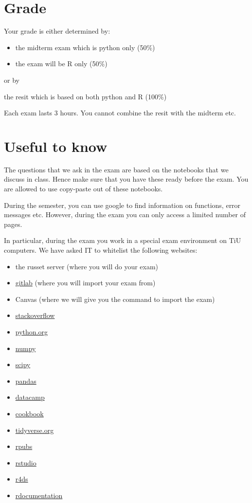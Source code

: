 \documentclass[]{book}
\providecommand{\tightlist}{%
  \setlength{\itemsep}{0pt}\setlength{\parskip}{0pt}}
\begin{document}
\section{Grade}\label{grade}

Your grade is either determined by:

\begin{itemize}
\tightlist
\item
  the midterm exam which is python only (50\%)
\item
  the exam will be R only (50\%)
\end{itemize}

or by

the resit which is based on both python and R (100\%)

Each exam lasts 3 hours. You cannot combine the resit with the midterm
etc.

\section{Useful to know}\label{useful-to-know}

The questions that we ask in the exam are based on the notebooks that we
discuss in class. Hence make sure that you have these ready before the
exam. You are allowed to use copy-paste out of these notebooks.

During the semester, you can use google to find information on
functions, error messages etc. However, during the exam you can only
access a limited number of pages.

In particular, during the exam you work in a special exam environment on
TiU computers. We have asked IT to whitelist the following websites:

\begin{itemize}
\tightlist
\item
  the russet server (where you will do your exam)
\item
  \href{gitlab.uvt.nl}{gitlab} (where you will import your exam from)
\item
  Canvas (where we will give you the command to import the exam)
\item
  \href{https://stackoverflow.com/}{stackoverflow}
\item
  \href{https://www.python.org/}{python.org}
\item
  \href{http://www.numpy.org/}{numpy}
\item
  \href{https://www.scipy.org/}{scipy}
\item
  \href{https://pandas.pydata.org/}{pandas}
\item
  \href{https://www.datacamp.com/home}{datacamp}
\item
  \href{http://www.cookbook-r.com/}{cookbook}
\item
  \href{https://dplyr.tidyverse.org/}{tidyverse.org}
\item
  \href{https://rpubs.com/}{rpubs}
\item
  \href{https://www.rstudio.com/}{rstudio}
\item
  \href{https://r4ds.had.co.nz/}{r4ds}
\item
  \href{https://www.rdocumentation.org/}{rdocumentation}
\end{itemize}
\end{document}
